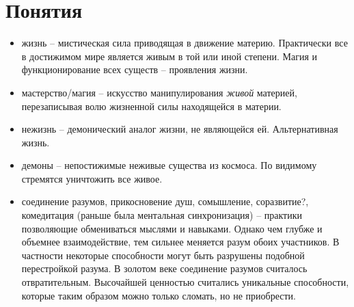\documentclass[12pt,a4paper]{article}
\begin{document}
\section*{Понятия}
\begin{itemize}
	\item жизнь -- мистическая сила приводящая в движение материю. Практически все в достижимом мире является живым в той или иной степени. Магия и функционирование всех существ -- проявления жизни.
	\item мастерство/магия -- искусство манипулирования {\it живой} материей, перезаписывая волю жизненной силы находящейся в материи.
	\item нежизнь -- демонический аналог жизни, не являющейся ей. Альтернативная жизнь.
	\item демоны -- непостижимые неживые существа из космоса. По видимому стремятся уничтожить все живое.
	\item соединение разумов, прикосновение душ, сомышление, соразвитие?, комедитация (раньше была ментальная синхронизация) -- практики позволяющие обмениваться мыслями и навыками. Однако чем глубже и объемнее взаимодействие, тем сильнее меняется разум обоих участников. В частности некоторые способности могут быть разрушены подобной перестройкой разума. В золотом веке соединение разумов считалось отвратительным. Высочайшей ценностью считались уникальные способности, которые таким образом можно только сломать, но не приобрести.
	

\end{itemize}
\end{document}
